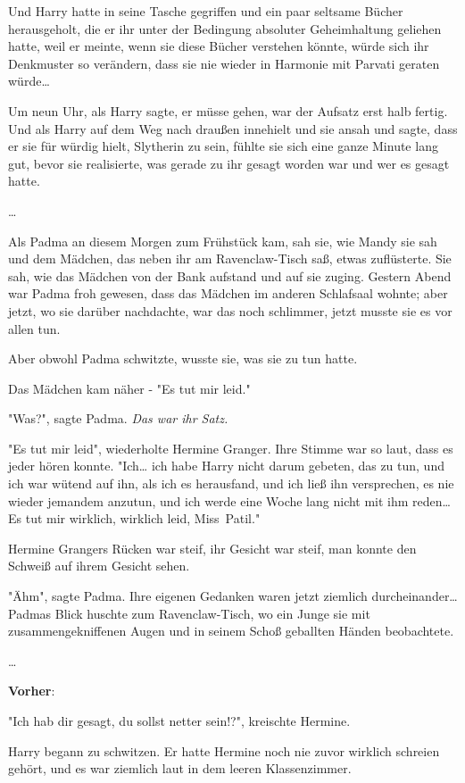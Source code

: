 {Und Harry hatte in seine Tasche gegriffen und ein paar seltsame Bücher herausgeholt, die er ihr unter der Bedingung absoluter Geheimhaltung geliehen hatte, weil er meinte, wenn sie diese Bücher verstehen könnte, würde sich ihr Denkmuster so verändern, dass sie nie wieder in Harmonie mit Parvati geraten würde…

Um neun Uhr, als Harry sagte, er müsse gehen, war der Aufsatz erst halb fertig. Und als Harry auf dem Weg nach draußen innehielt und sie ansah und sagte, dass er sie für würdig hielt, Slytherin zu sein, fühlte sie sich eine ganze Minute lang gut, bevor sie realisierte, was gerade zu ihr gesagt worden war und wer es gesagt hatte.

…

Als Padma an diesem Morgen zum Frühstück kam, sah sie, wie Mandy sie sah und dem Mädchen, das neben ihr am Ravenclaw-Tisch saß, etwas zuflüsterte. Sie sah, wie das Mädchen von der Bank aufstand und auf sie zuging. Gestern Abend war Padma froh gewesen, dass das Mädchen im anderen Schlafsaal wohnte; aber jetzt, wo sie darüber nachdachte, war das noch schlimmer, jetzt musste sie es vor allen tun.

Aber obwohl Padma schwitzte, wusste sie, was sie zu tun hatte.

Das Mädchen kam näher - "Es tut mir leid."

"Was?", sagte Padma. \emph{Das war ihr Satz.}

"Es tut mir leid", wiederholte Hermine Granger. Ihre Stimme war so laut, dass es jeder hören konnte. "Ich… ich habe Harry nicht darum gebeten, das zu tun, und ich war wütend auf ihn, als ich es herausfand, und ich ließ ihn versprechen, es nie wieder jemandem anzutun, und ich werde eine Woche lang nicht mit ihm reden… Es tut mir wirklich, wirklich leid, Miss~Patil."

Hermine Grangers Rücken war steif, ihr Gesicht war steif, man konnte den Schweiß auf ihrem Gesicht sehen.

"Ähm", sagte Padma. Ihre eigenen Gedanken waren jetzt ziemlich durcheinander… Padmas Blick huschte zum Ravenclaw-Tisch, wo ein Junge sie mit zusammengekniffenen Augen und in seinem Schoß geballten Händen beobachtete.

…

\textbf{Vorher}:

"Ich hab dir gesagt, du sollst netter sein!?", kreischte Hermine.

Harry begann zu schwitzen. Er hatte Hermine noch nie zuvor wirklich schreien gehört, und es war ziemlich laut in dem leeren Klassenzimmer.

}
